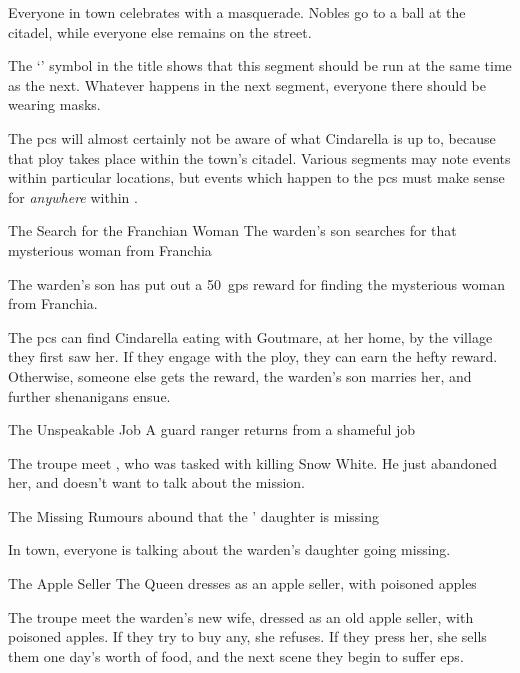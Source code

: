 \begin{multicols}{2}
Everyone in town celebrates with a masquerade.
Nobles go to a ball at the citadel, while everyone else remains on the street.

The `\squash' symbol in the title shows that this \gls{segment} should be run at the same time as the next.
Whatever happens in the next \gls{segment}, everyone there should be wearing masks.

The \glspl{pc} will almost certainly not be aware of what Cindarella is up to, because that ploy takes place within the town's citadel.
Various \glspl{segment} may note events within particular locations, but events which happen to the \glspl{pc} must make sense for \textit{anywhere} within .

{The Search for the Franchian Woman}%
{The \gls{warden}'s son searches for that mysterious woman from Franchia}%

\begin{exampletext}
  The \gls{warden}'s son has put out a 50~\glspl{gp} reward for finding the mysterious woman from Franchia.
\end{exampletext}

The \glspl{pc} can find Cindarella eating with Goutmare, at her home, by the \gls{village} they first saw her.
If they engage with the ploy, they can earn the hefty reward.
Otherwise, someone else gets the reward, the \gls{warden}'s son marries her, and further shenanigans ensue.




{The Unspeakable Job}%
{A \gls{guard} \gls{ranger} returns from a shameful job}%

The troupe meet , who was tasked with killing Snow White.
He just abandoned her, and doesn't want to talk about the mission.


{The Missing }%
{Rumours abound that the ' daughter is missing}%

In town, everyone is talking about the \gls{warden}'s daughter going missing.

{The Apple Seller}%
{The Queen dresses as an apple seller, with poisoned apples}%

The troupe meet the \gls{warden}'s new wife, dressed as an old apple seller, with poisoned apples.
If they try to buy any, she refuses.
If they press her, she sells them one day's worth of food, and the next scene they begin to suffer \glspl{ep}.


\end{multicols}
